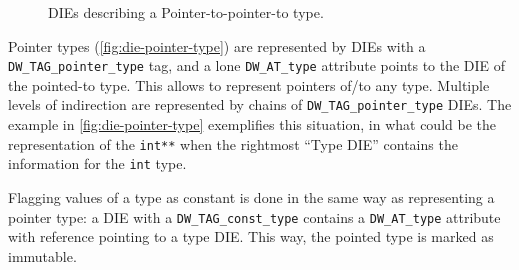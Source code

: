 
\begin{figure}
  \centering
  \caption{DIEs describing a Pointer-to-pointer-to type.}
  \label{fig:die-pointer-type}
\end{figure}

Pointer types (\autoref{fig:die-pointer-type}) are represented by DIEs with
a \verb|DW_TAG_pointer_type| tag, and a lone \verb|DW_AT_type| attribute
points to the DIE of the pointed-to type. This allows to represent pointers
of/to any type. Multiple levels of indirection are represented by chains of
\verb|DW_TAG_pointer_type| DIEs. The example in \autoref{fig:die-pointer-type}
exemplifies this situation, in what could be the representation of the
\texttt{int**} when the rightmost “Type DIE” contains the information
for the \texttt{int} type.



Flagging values of a type as constant is done in the same way as representing
a pointer type: a DIE with a \verb|DW_TAG_const_type| contains
a \verb|DW_AT_type| attribute with reference pointing to a type DIE.
This way, the pointed type is marked as immutable.



